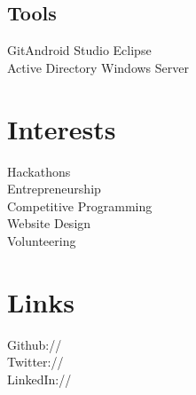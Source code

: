 \documentclass[]{DavidTsenterResume}
\begin{document}
\begin{minipage}[t]{0.33\textwidth}
\subsection{Tools}
 Git\textbullet{}Android Studio \textbullet{}Eclipse\\
\textbullet{}Active Directory \textbullet{}Windows Server  \\

\vspace{4mm}


\section{Interests}
\textbullet{} Hackathons \\
\textbullet{} Entrepreneurship \\
\textbullet{} Competitive Programming \\
\textbullet{} Website Design \\
\textbullet{} Volunteering\\
\sectionsep
\sectionsep

\section{Links} 
Github:// \href{https://github.com/tsenterd}{} \\
Twitter://  \href{https://twitter.com/TsenterDavid}{} \\
LinkedIn://  \href{https://www.linkedin.com/in/davidtsenter}{}
\sectionsep

%
%

\end{minipage} 
\hfill
\end{document}
